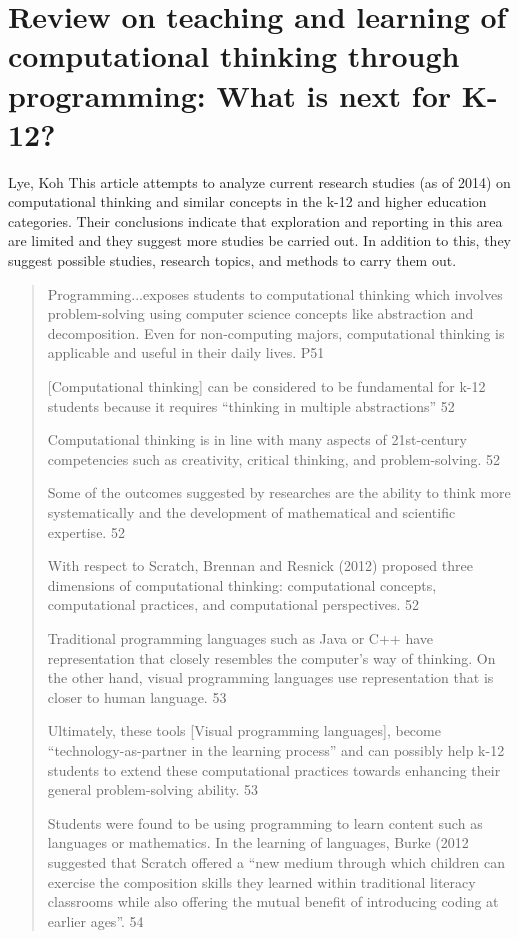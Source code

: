 \documentclass[12pt]{extarticle}
\begin{document}
\section{Review on teaching and learning of computational thinking through programming: What is next for K-12?} 
Lye, Koh
This article attempts to analyze current research studies (as of 2014) on computational thinking and similar concepts in the k-12 and higher education categories. Their conclusions indicate that exploration and reporting in this area are limited and they suggest more studies be carried out. In addition to this, they suggest possible studies, research topics, and methods to carry them out. 
\begin{quote}
    
    Programming...exposes students to computational thinking which involves problem-solving using computer science concepts like abstraction and decomposition. Even for non-computing majors, computational thinking is applicable and useful in their daily lives. P51
    
    [Computational thinking] can be considered to be fundamental for k-12 students because it requires “thinking in multiple abstractions” 52
    
    Computational thinking is in line with many aspects of 21st-century competencies such as creativity, critical thinking, and problem-solving. 52
    
    Some of the outcomes suggested by researches are the ability to think more systematically and the development of mathematical and scientific expertise. 52
    
    With respect to Scratch, Brennan and Resnick (2012) proposed three dimensions of computational thinking: computational concepts, computational practices, and computational perspectives. 52
    
    Traditional programming languages such as Java or C++ have representation that closely resembles the computer’s way of thinking. On the other hand, visual programming languages use representation that is closer to human language. 53
    
    Ultimately, these tools [Visual programming languages],  become “technology-as-partner in the learning process” and can possibly help k-12 students to extend these computational practices towards enhancing their general problem-solving ability. 53
    
    Students were found to be using programming to learn content such as languages or mathematics. In the learning of languages, Burke (2012 suggested that Scratch offered a  “new medium through which children can exercise the composition skills they learned within traditional literacy classrooms while also offering the mutual benefit of introducing coding at earlier ages”. 54
    

\end{quote}
\end{document}
